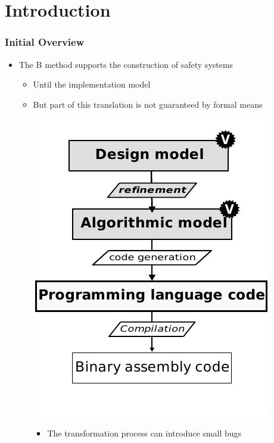 
\section{Introduction}


\begin{frame}
\frametitle{Initial Overview}

\begin{itemize}[<+->]
  \item The B method supports the construction of safety systems
  \begin{itemize}
    \item Until the implementation model
    \item But part of this translation is not guaranteed by formal means\\
    \begin{center}
       \includegraphics[height=.5\textheight]{figures/b-method-actual_new.pdf}
    \end{center}
       \begin{itemize} \item   \small{The transformation process can introduce small bugs}
       \end{itemize}
  \end{itemize}
\end{itemize}
   

	
\end{frame}




